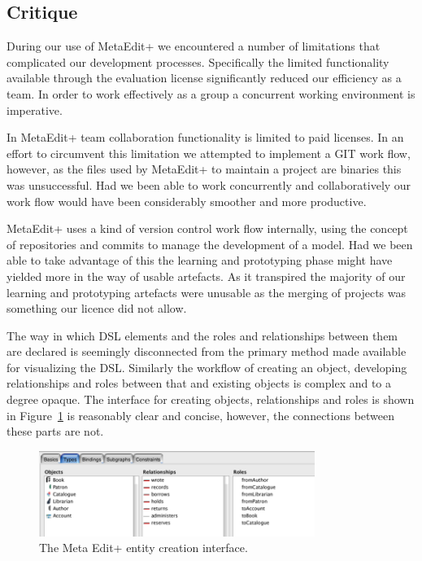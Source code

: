 \subsection{Critique}
During our use of MetaEdit+ we encountered a number of limitations that complicated our development processes. Specifically the limited functionality available through the evaluation license significantly reduced our efficiency as a team. In order to work effectively as a group a concurrent working environment is imperative.\par
In MetaEdit+ team collaboration functionality is limited to paid licenses. In an effort to circumvent this limitation we attempted to implement a GIT work flow, however, as the files used by MetaEdit+ to maintain a project are binaries this was unsuccessful. Had we been able to work concurrently and collaboratively our work flow would have been considerably smoother and more productive.\par
MetaEdit+ uses a kind of version control work flow internally, using the concept of repositories and commits to manage the development of a model. Had we been able to take advantage of this the learning and prototyping phase might have yielded more in the way of usable artefacts. As it transpired the majority of our learning and prototyping artefacts were unusable as the merging of projects was something our licence did not allow.

The way in which DSL elements and the roles and relationships between them are declared is seemingly disconnected from the primary method made available for visualizing the DSL. Similarly the workflow of creating an object, developing relationships and roles between that and existing objects is complex and to a degree opaque. The interface for creating objects, relationships and roles is shown in Figure~\ref{fig:objcreate} is reasonably clear and concise, however, the connections between these parts are not. 

\begin{figure}
  \centering
  \includegraphics[width=0.8\textwidth]{images/entity_creation.png}
  \caption{The Meta Edit+ entity creation interface.}
  \label{fig:objcreate}
\end{figure}

